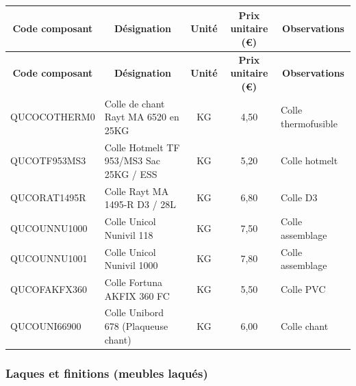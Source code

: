 \documentclass[12pt,a4paper]{article}
\begin{document}
\begin{longtable}{|p{4cm}|p{7cm}|c|c|p{2cm}|}
\hline
\multicolumn{1}{|c|}{\textbf{Code composant}} & \multicolumn{1}{c|}{\textbf{Désignation}} & \multicolumn{1}{c|}{\textbf{Unité}} & \multicolumn{1}{c|}{\textbf{Prix unitaire (€)}} & \multicolumn{1}{c|}{\textbf{Observations}} \\
\hline
\endfirsthead
\hline
\multicolumn{1}{|c|}{\textbf{Code composant}} & \multicolumn{1}{c|}{\textbf{Désignation}} & \multicolumn{1}{c|}{\textbf{Unité}} & \multicolumn{1}{c|}{\textbf{Prix unitaire (€)}} & \multicolumn{1}{c|}{\textbf{Observations}} \\
\hline
\endhead
\hline
\endfoot
QUCOCOTHERM0 & Colle de chant Rayt MA 6520 en 25KG & KG & 4,50 & Colle thermofusible \\
QUCOTF953MS3 & Colle Hotmelt TF 953/MS3 Sac 25KG / ESS & KG & 5,20 & Colle hotmelt \\
QUCORAT1495R & Colle Rayt MA 1495-R D3 / 28L & KG & 6,80 & Colle D3 \\
QUCOUNNU1000 & Colle Unicol Nunivil 118 & KG & 7,50 & Colle assemblage \\
QUCOUNNU1001 & Colle Unicol Nunivil 1000 & KG & 7,80 & Colle assemblage \\
QUCOFAKFX360 & Colle Fortuna AKFIX 360 FC & KG & 5,50 & Colle PVC \\
QUCOUNI66900 & Colle Unibord 678 (Plaqueuse chant) & KG & 6,00 & Colle chant \\
\hline
\end{longtable}

\subsubsection{Laques et finitions (meubles laqués)}
\end{document}
